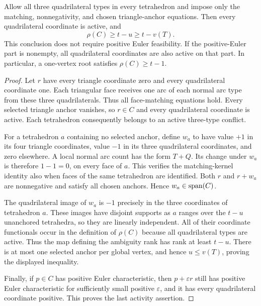 \begin{theorem}
\label{thm:active-root-obstruction}
Allow all three quadrilateral types in every tetrahedron and impose only
the matching, nonnegativity, and chosen triangle-anchor equations.  Then
every quadrilateral coordinate is active, and
\begin{equation}\label{eq:active-root-lower}
 \rho(C)\ge t-u\ge t-v(T).
\end{equation}
This conclusion does not require positive Euler feasibility.  If the
positive-Euler part is nonempty, all quadrilateral coordinates are also
active on that part.  In particular, a one-vertex root satisfies
$\rho(C)\ge t-1$.
\end{theorem}

\begin{proof}
Let $r$ have every triangle coordinate zero and every quadrilateral
coordinate one.  Each triangular face receives one arc of each normal arc
type from these three quadrilaterals.  Thus all face-matching equations
hold.  Every selected triangle anchor vanishes, so $r\in C$ and every
quadrilateral coordinate is active.  Each tetrahedron consequently belongs
to an active three-type conflict.

For a tetrahedron $a$ containing no selected anchor, define $w_a$ to have
value $+1$ in its four triangle coordinates, value $-1$ in its three
quadrilateral coordinates, and zero elsewhere.  A local normal arc count
has the form $T+Q$.  Its change under $w_a$ is therefore $1-1=0$, on every
face of $a$.  This verifies the matching-kernel identity also when faces of
the same tetrahedron are identified.  Both $r$ and $r+w_a$ are nonnegative
and satisfy all chosen anchors.  Hence $w_a\in\operatorname{span}(C)$.

The quadrilateral image of $w_a$ is $-1$ precisely in the three coordinates
of tetrahedron $a$.  These images have disjoint supports as $a$ ranges over
the $t-u$ unanchored tetrahedra, so they are linearly independent.  All of
their coordinate functionals occur in the definition of $\rho(C)$ because
all quadrilateral types are active.  Thus the map defining the ambiguity
rank has rank at least $t-u$.  There is at most one selected anchor per
global vertex, and hence $u\le v(T)$, proving the displayed inequality.

Finally, if $p\in C$ has positive Euler characteristic, then
$p+\varepsilon r$ still has positive Euler characteristic for sufficiently
small positive $\varepsilon$, and it has every quadrilateral coordinate
positive.  This proves the last activity assertion.
\end{proof}

